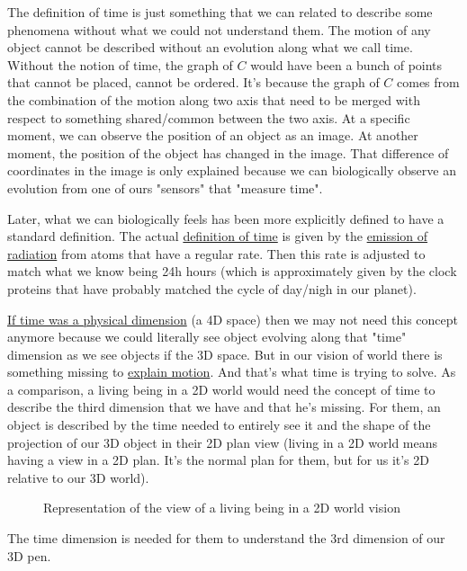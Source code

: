 \documentclass[12pt]{article}
\begin{document}
The definition of time is just something that we can related to describe some phenomena without what we could not understand them. The motion of any object cannot be described without an evolution along what we call time. Without the notion of time, the graph of $C$ would have been a bunch of points that cannot be placed, cannot be ordered. It's because the graph of $C$ comes from the combination of the motion along two axis that need to be merged with respect to something shared/common between the two axis. At a specific moment, we can observe the position of an object as an image. At another moment, the position of the object has changed in the image. That difference of coordinates in the image is only explained because we can biologically observe an evolution from one of ours "sensors" that "measure time".

Later, what we can biologically feels has been more explicitly defined to have a standard definition. The actual \href{https://www.nist.gov/how-do-you-measure-it/how-do-we-measure-time}{definition of time} is given by the \href{https://en.wikipedia.org/wiki/International_Atomic_Time}{emission of radiation} from atoms that have a regular rate. Then this rate is adjusted to match what we know being 24h hours (which is approximately given by the clock proteins that have probably matched  the cycle of day/nigh in our planet).

\href{https://www.youtube.com/watch?v=EedRLTlOp20&ab_channel=Scilabus}{If time was a physical dimension} (a 4D space) then we may not need this concept anymore because we could literally see object evolving along that "time" dimension as we see objects if the 3D space. But in our vision of world there is something missing to \href{https://www.youtube.com/watch?v=NDYIdBMLQR0&ab_channel=argerichrichter1234}{explain motion}. And that's what time is trying to solve. As a comparison, a living being in a 2D world would need the concept of time to describe the third dimension that we have and that he's missing. For them, an object is described by the time needed to entirely see it and the shape of the projection of our 3D object in their 2D plan view (living in a 2D world means having a view in a 2D plan. It's the normal plan for them, but for us it's 2D relative to our 3D world).

\begin{figure}[H]
 \centering
 
 \caption*{Representation of the view of a living being in a 2D world vision}
\end{figure}
The time dimension is needed for them to understand the 3rd dimension of our 3D pen.
\end{document}
